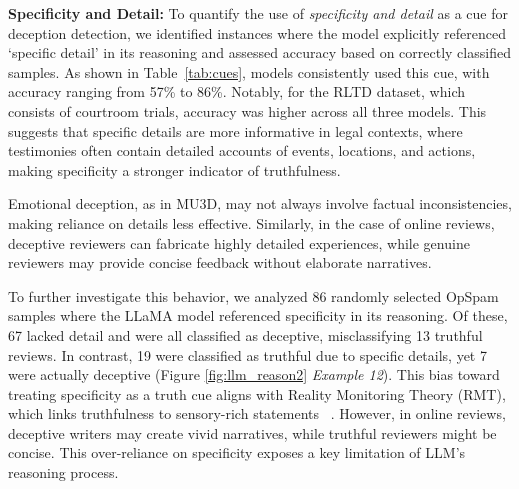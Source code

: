 \textbf{Specificity and Detail:} To quantify the use of  \textit{specificity and detail} as a cue for deception detection, we identified instances where the model explicitly referenced `specific detail' in its reasoning and assessed accuracy based on correctly classified samples. As shown in Table~\ref{tab:cues}, models consistently used this cue, with accuracy ranging from 57\% to 86\%.  Notably, for the RLTD dataset, which consists of courtroom trials, accuracy was higher across all three models. This suggests that specific details are more informative in legal contexts, where testimonies often contain detailed accounts of events, locations, and actions, making specificity a stronger indicator of truthfulness. 

Emotional deception, as in MU3D, may not always involve factual inconsistencies, making reliance on details less effective. Similarly, in the case of online reviews, deceptive reviewers can fabricate highly detailed experiences, while genuine reviewers may provide concise feedback without elaborate narratives.

To further investigate this behavior, we analyzed 86 randomly selected OpSpam samples where the LLaMA model referenced specificity in its reasoning. Of these, 67 lacked detail and were all classified as deceptive, misclassifying 13 truthful reviews. In contrast, 19 were classified as truthful due to specific details, yet 7 were actually deceptive (Figure \ref{fig:llm_reason2} \textit{Example 12}). This bias toward treating specificity as a truth cue aligns with Reality Monitoring Theory (RMT), which links truthfulness to sensory-rich statements ~\cite{vrij2008detecting}. However, in online reviews, deceptive writers may create vivid narratives, while truthful reviewers might be concise. This over-reliance on specificity exposes a key limitation of LLM’s reasoning process.

